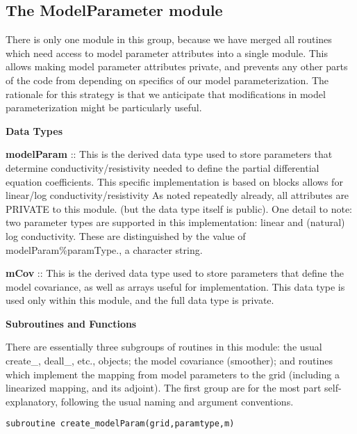 \documentclass[12pt]{article}
\begin{document}
\subsection{The ModelParameter module}

There is only one module in this group, because we
have merged all routines which need access to model
parameter attributes into a single module.  This allows
making model parameter attributes private, and
prevents any other parts of the code from depending
on specifics of our model parameterization.  The rationale
for this strategy is that we anticipate that modifications
in model parameterization might be particularly useful.

\vspace{10pt}

\noindent
{\bf Data Types} 

\vspace{6pt}

\noindent
{\bf modelParam} :: This is the derived data type used to store parameters that
determine conductivity/resistivity needed to define the
partial differential equation coefficients.
This specific implementation is based on blocks
allows for linear/log conductivity/resistivity
As noted repeatedly already, all attributes are PRIVATE
to this module. (but the data type itself is public).
One detail to note: two parameter types are supported
in this implementation: linear and (natural) log conductivity.
These are distinguished by the value of modelParam\%paramType.,
a character string.

\noindent
{\bf mCov} :: This is the derived data type used to store parameters that
define the model covariance, as well as arrays useful for
implementation.  This data type is used only within this
module, and the full data type is private.

\vspace{10pt}

\noindent
{\bf Subroutines and Functions}

\vspace{6pt}

There are essentially three subgroups of routines in this module:
the usual create\_, deall\_, etc., objects; the model covariance
(smoother); and routines which implement the mapping from
model parameters to the grid (including a linearized mapping,
and its adjoint).  The first group are for the most part self-explanatory,
following the usual naming and argument conventions.

\begin{verbatim}
subroutine create_modelParam(grid,paramtype,m)
\end{verbatim}
\end{document}
